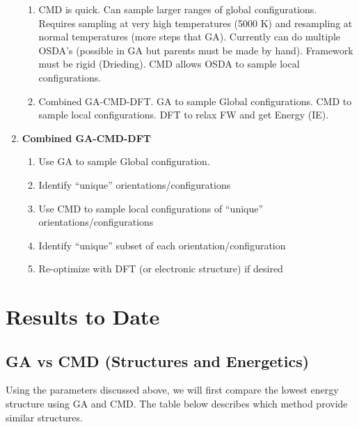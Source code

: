 \documentclass[journal=accacs,manuscript=article, email=true, layout=traditional]{achemso}
\begin{document}
\begin{enumerate}
\begin{enumerate}
\item CMD is quick. Can sample larger ranges of global configurations. Requires sampling at very high temperatures (5000 K) and resampling at normal temperatures (more steps that GA). Currently can do multiple OSDA's (possible in GA but parents must be made by hand). Framework must be rigid (Drieding). CMD allows OSDA to sample local configurations.

\item Combined GA-CMD-DFT. GA to sample Global configurations. CMD to sample local configurations. DFT to relax FW and get Energy (IE).
\end{enumerate}

\item \textbf{Combined GA-CMD-DFT}

\begin{enumerate}
\item Use GA to sample Global configuration.

\item Identify ``unique'' orientations/configurations

\item Use CMD to sample local configurations of ``unique'' orientations/configurations

\item Identify ``unique'' subset of each orientation/configuration

\item Re-optimize with DFT (or electronic structure) if desired
\end{enumerate}
\end{enumerate}






\section{Results to Date}
\label{sec:orgecc93e8}
\subsection{GA vs CMD (Structures and Energetics)}
\label{sec:orgbc9af27}
Using the parameters discussed above, we will first compare the lowest energy structure using GA and CMD. The table below describes which method provide similar structures. 
\end{document}
